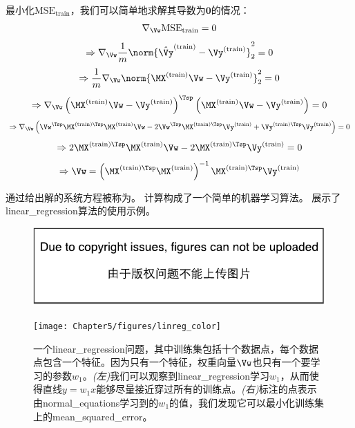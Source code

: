 最小化$\text{MSE}_{\text{train}}$，我们可以简单地求解其导数为$\mathbf{0}$的情况：
\begin{equation}
\nabla_{\Vw} \text{MSE}_{\text{train}} = 0
\end{equation}
\begin{equation}
\Rightarrow \nabla_{\Vw} \frac{1}{m} \norm{ \hat{\Vy}^{(\text{train})} - \Vy^{(\text{train})}}_2^2 = 0
\end{equation}
\begin{equation}
\Rightarrow \frac{1}{m} \nabla_{\Vw} \norm{ \MX^{(\text{train})}\Vw - \Vy^{(\text{train})}}_2^2 = 0
\end{equation}
\begin{equation}
\Rightarrow \nabla_{\Vw} \left( \MX^{(\text{train})}\Vw - \Vy^{(\text{train})} \right)^\Tsp \left( \MX^{(\text{train})}\Vw - \Vy^{(\text{train})} \right) = 0
\end{equation}
\begin{equation}
\Rightarrow \nabla_{\Vw} \left( 
    \Vw^\Tsp \MX^{(\text{train})\Tsp}\MX^{(\text{train})}\Vw - 2\Vw^\Tsp\MX^{(\text{train})\Tsp} \Vy^{(\text{train})} + \Vy^{(\text{train})\Tsp}\Vy^{(\text{train})}  
  \right) = 0
\end{equation}
\begin{equation}
    \Rightarrow 2\MX^{(\text{train})\Tsp}\MX^{(\text{train})} \Vw  -
    2\MX^{(\text{train})\Tsp} \Vy^{(\text{train})}  = 0
\end{equation}
\begin{equation}
\label{eq:5.12}
    \Rightarrow \Vw =  \left(\MX^{(\text{train})\Tsp}\MX^{(\text{train})}
     \right)^{-1} \MX^{(\text{train})\Tsp} \Vy^{(\text{train})}
\end{equation}


通过给出解的系统方程被称为。
计算构成了一个简单的机器学习算法。
展示了\gls{linear_regression}算法的使用示例。

\begin{figure}[!htb]
\ifOpenSource
\centerline{\includegraphics{figure.pdf}}
\else
\centerline{\texttt{[image: Chapter5/figures/linreg\_color]}}
\fi
\caption{一个\gls{linear_regression}问题，其中训练集包括十个数据点，每个数据点包含一个特征。因为只有一个特征，权重向量$\Vw$也只有一个要学习的参数$w_1$。\emph{(左)}我们可以观察到\gls{linear_regression}学习$w_1$，从而使得直线$y=w_1x$能够尽量接近穿过所有的训练点。\emph{(右)}标注的点表示由\gls{normal_equations}学习到的$w_1$的值，我们发现它可以最小化训练集上的\gls{mean_squared_error}。}
\label{fig:chap5_linreg}
\end{figure}

